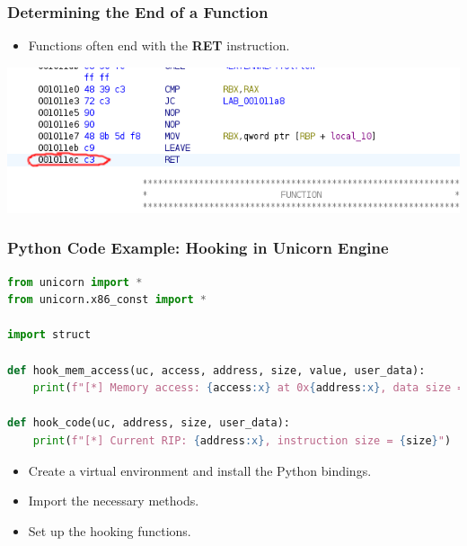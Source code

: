 \begin{frame}
    \frametitle{Determining the End of a Function}
    \begin{itemize}
        \item Functions often end with the \textbf{RET} instruction.
    \end{itemize}
    \vspace{1cm}
    \centering
    \includegraphics[scale=0.5]{img/end.png}
\end{frame}


\begin{frame}[fragile]
\frametitle{Python Code Example: Hooking in Unicorn Engine}
\begin{lstlisting}[language=Python, caption={Hooking Example with Unicorn Engine}]
from unicorn import *
from unicorn.x86_const import *

import struct

def hook_mem_access(uc, access, address, size, value, user_data):
    print(f"[*] Memory access: {access:x} at 0x{address:x}, data size = {size}, data value = 0x{value:x}")

def hook_code(uc, address, size, user_data):
    print(f"[*] Current RIP: {address:x}, instruction size = {size}")
\end{lstlisting}

\begin{itemize}
    \item Create a virtual environment and install the Python bindings.
    \item Import the necessary methods.
    \item Set up the hooking functions.
\end{itemize}

\end{frame}


